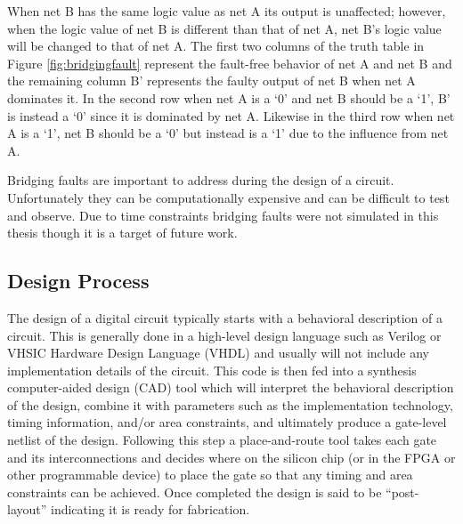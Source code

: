 \documentclass[12pt]{report}
\begin{document}
When net B has the same logic value as net A its output is unaffected; however, when the logic value of net B is different than that of net A, net B's logic value will be changed to that of net A.  The first two columns of the truth table in Figure \ref{fig:bridgingfault} represent the fault-free behavior of net A and net B and the remaining column B' represents the faulty output of net B when net A dominates it.  In the second row when net A is a `0' and net B should be a `1', B' is instead a `0' since it is dominated by net A.  Likewise in the third row when net A is a `1', net B should be a `0' but instead is a `1' due to the influence from net A.

Bridging faults are important to address during the design of a circuit.  Unfortunately they can be computationally expensive and can be difficult to test and observe\cite{stroud-bridging}.  Due to time constraints bridging faults were not simulated in this thesis though it is a target of future work.

\subsection{Design Process}
\label{sct:designprocess}
The design of a digital circuit typically starts with a behavioral description of a circuit.  This is generally done in a high-level design language such as Verilog or VHSIC Hardware Design Language (VHDL) and usually will not include any implementation details of the circuit\cite{advancedverilog}.  This code is then fed into a synthesis computer-aided design (CAD) tool which will interpret the behavioral description of the design, combine it with parameters such as the implementation technology, timing information, and/or area constraints, and ultimately produce a gate-level netlist of the design\cite{advancedverilog}.  Following this step a place-and-route tool takes each gate and its interconnections and decides where on the silicon chip (or in the FPGA or other programmable device) to place the gate so that any timing and area constraints can be achieved.  Once completed the design is said to be ``post-layout'' indicating it is ready for fabrication\cite{advancedverilog}.
\end{document}
